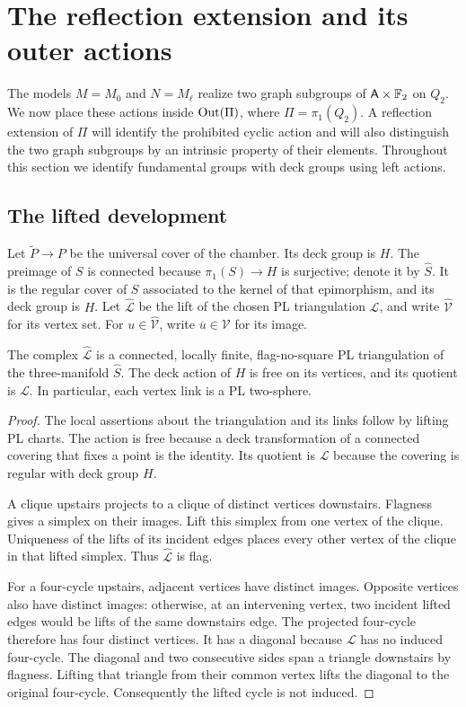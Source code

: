\section{The reflection extension and its outer actions}
\label{ext:section}

The models $M=M_0$ and $N=M_\ell$ realize two graph subgroups of
$\mathsf A\times\mathbb F_2$ on $Q_2$.  We now place these actions inside
$\operatorname{Out}(\Pi)$, where $\Pi=\pi_1(Q_2)$.  A reflection extension of
$\Pi$ will identify the prohibited cyclic action and will also
distinguish the two graph subgroups by an intrinsic property of their
elements.  Throughout this section we identify fundamental groups
with deck groups using left actions.

\subsection{The lifted development}

Let $\widetilde P\to P$ be the universal cover of the chamber.  Its
deck group is $H$.  The preimage of $S$ is connected because
$\pi_1(S)\to H$ is surjective; denote it by $\widehat S$.  It is the
regular cover of $S$ associated to the kernel of that epimorphism,
and its deck group is $H$.  Let $\widehat{\mathcal L}$ be the lift of
the chosen PL triangulation $\mathcal L$, and write
$\widehat{\mathcal V}$ for its vertex set.  For
$u\in\widehat{\mathcal V}$, write $\overline u\in\mathcal V$ for its
image.

\begin{lemma}\label{ext:lifted-nerve}
The complex $\widehat{\mathcal L}$ is a connected, locally finite,
flag-no-square PL triangulation of the three-manifold $\widehat S$.
The deck action of $H$ is free on its vertices, and its quotient is
$\mathcal L$.  In particular, each vertex link is a PL two-sphere.
\end{lemma}

\begin{proof}
The local assertions about the triangulation and its links follow
by lifting PL charts.  The action is free because a deck
transformation of a connected covering that fixes a point is the
identity.  Its quotient is $\mathcal L$ because the covering is
regular with deck group $H$.

A clique upstairs projects to a clique of distinct vertices
downstairs.  Flagness gives a simplex on their images.  Lift this
simplex from one vertex of the clique.  Uniqueness of the lifts of
its incident edges places every other vertex of the clique in that
lifted simplex.  Thus $\widehat{\mathcal L}$ is flag.

For a four-cycle upstairs, adjacent vertices have distinct images.
Opposite vertices also have distinct images: otherwise, at an
intervening vertex, two incident lifted edges would be lifts of the
same downstairs edge.  The projected four-cycle therefore has four
distinct vertices.  It has a diagonal because $\mathcal L$ has no
induced four-cycle.  The diagonal and two consecutive sides span a
triangle downstairs by flagness.  Lifting that triangle from their
common vertex lifts the diagonal to the original four-cycle.
Consequently the lifted cycle is not induced.
\end{proof}

